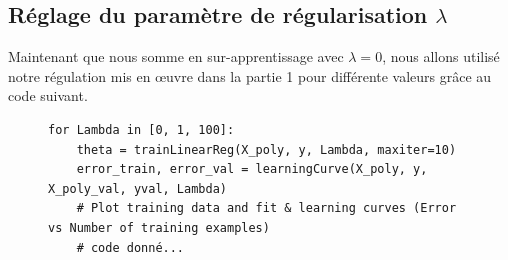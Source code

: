 \subsection{Réglage du paramètre de régularisation $\lambda$}\label{sec:select-lambda}

Maintenant que nous somme en sur-apprentissage avec $\lambda = 0$, nous allons utilisé notre régulation mis en œuvre dans la partie 1 pour différente valeurs grâce au code suivant.


\begin{figure}[!h]
\begin{verbatim}
for Lambda in [0, 1, 100]:
    theta = trainLinearReg(X_poly, y, Lambda, maxiter=10)
    error_train, error_val = learningCurve(X_poly, y, X_poly_val, yval, Lambda)
    # Plot training data and fit & learning curves (Error vs Number of training examples)
    # code donné...
\end{verbatim}   
\end{figure}
    


